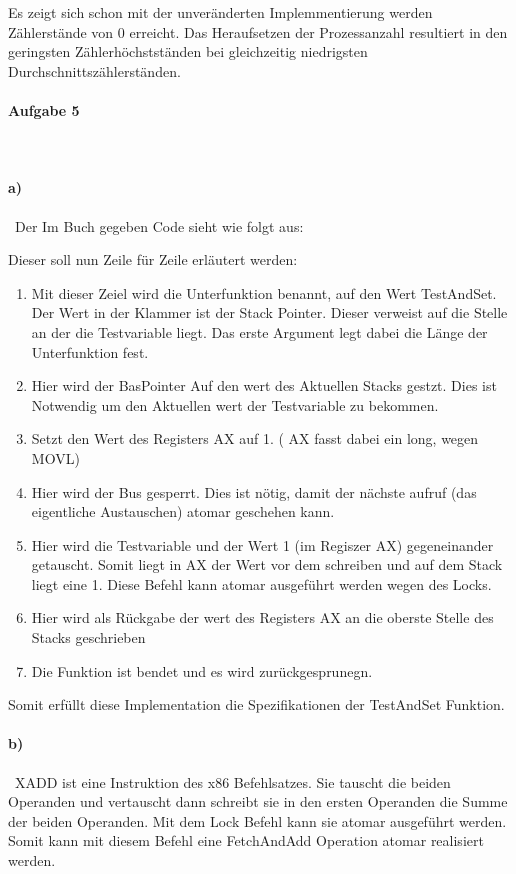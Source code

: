 \documentclass[11pt]{scrartcl} %
\begin{document}
Es zeigt sich schon mit der unveränderten Implemmentierung werden Zählerstände von 0 erreicht. 
Das Heraufsetzen der Prozessanzahl resultiert in den geringsten Zählerhöchstständen bei gleichzeitig niedrigsten Durchschnittszählerständen.  

\paragraph{Aufgabe 5}\

\paragraph{a)}\
Der Im Buch gegeben Code sieht wie folgt aus:

 


Dieser soll nun Zeile für Zeile erläutert werden:

\begin{enumerate}
\item Mit dieser Zeiel wird die Unterfunktion benannt, auf den Wert TestAndSet. Der Wert in der Klammer ist der Stack Pointer. Dieser verweist auf die Stelle an der die Testvariable liegt. Das erste Argument legt dabei die Länge der Unterfunktion fest. 
\item Hier wird der BasPointer Auf den wert des Aktuellen Stacks gestzt. Dies ist Notwendig um den Aktuellen wert der Testvariable zu bekommen.
\item Setzt den Wert des Registers AX auf 1. ( AX fasst dabei ein long, wegen MOVL)
\item Hier wird der Bus gesperrt. Dies ist nötig, damit der nächste aufruf (das eigentliche Austauschen) atomar geschehen kann.
\item Hier wird die Testvariable und der Wert 1 (im Regiszer AX) gegeneinander getauscht. Somit liegt in AX der Wert vor dem schreiben und auf dem Stack liegt eine 1. Diese Befehl kann atomar ausgeführt werden wegen des Locks.
\item Hier wird als Rückgabe der wert des Registers AX an die oberste Stelle des Stacks geschrieben
\item Die Funktion ist bendet und es wird zurückgesprunegn.
\end{enumerate}


Somit erfüllt diese Implementation die Spezifikationen der TestAndSet Funktion. 

\paragraph{b)}\
XADD ist eine Instruktion des x86 Befehlsatzes. Sie tauscht die beiden Operanden und vertauscht dann schreibt sie in den ersten Operanden die Summe der beiden Operanden. Mit dem Lock Befehl kann sie atomar ausgeführt werden. Somit kann mit diesem Befehl eine FetchAndAdd Operation atomar realisiert werden.

 
\end{document}
